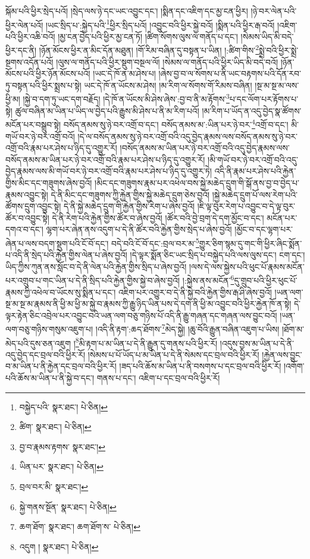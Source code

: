 སྐོམ་པའི་ཕྱིར་སྲེད་པའོ། །སྲེད་ལས་ཉེ་དང་ཡང་འབྱུང་དང་། །སྨིན་དང་འཇིག་དང་མྱ་ངན་ཕྱིར། །ཉེ་བར་ལེན་པའི་ཕྱིར་ལེན་པའོ། །ཡང་སྲིད་པ་:སྐྱེད་པའི་\footnote{བསྐྱེད་པའི་  སྣར་ཐང་།  པེ་ཅིན། }ཕྱིར་སྲིད་པའོ། །འབྱུང་བའི་ཕྱིར་སྐྱེ་བའོ། །སྨིན་པའི་ཕྱིར་རྒ་བའོ། །འཇིག་པའི་ཕྱིར་འཆི་བའོ། །མྱ་ངན་བྱེད་པའི་ཕྱིར་མྱ་ངན་ཏོ། །ཚིག་སོགས་ལུས་ལ་གནོད་པ་དང་། །སེམས་ཡིད་མི་བདེ་ཕྱིར་དང་ནི། །ཉོན་མོངས་ཕྱིར་ན་མིང་དོན་མཐུན། །གོ་རིམ་བཞིན་དུ་བསྟན་པ་ཡིན། །:ཚིག་གིས་\footnote{ཚིག་  སྣར་ཐང་།  པེ་ཅིན། }སྨྲེ་བའི་ཕྱིར་སྨྲེ་སྔགས་འདོན་པའོ། །ལུས་ལ་གནོད་པའི་ཕྱིར་སྡུག་བསྔལ་ལོ། །སེམས་ལ་གནོད་པའི་ཕྱིར་ཡིད་མི་བདེ་བའོ། །ཉོན་མོངས་པའི་ཕྱིར་ཉོན་མོངས་པའོ། །ཡང་དེ་ཁོ་ན་མ་ཤེས་པ། །ཞེས་བྱ་བ་ལ་སོགས་པ་ནི་ཡང་བརྟགས་པའི་དོན་རབ་ཏུ་བསྟན་པའི་ཕྱིར་སྨྲས་པ་སྟེ། ཡང་དེ་ཁོ་ན་ཡོངས་མ་ཤེས། །མ་རིག་ལ་སོགས་གོ་རིམས་བཞིན། །སྔ་མ་སྔ་མ་ལས་ཕྱི་མ། །སྐྱེ་བ་དག་ཏུ་ཡང་དག་བརྗོད། །དེ་ཁོ་ན་ཡོངས་མི་ཤེས་ཞེས་:བྱ་བ་ནི་མ་རྟོགས་\footnote{བྱ་བ་རྣམས་རྟགས་  སྣར་ཐང་། }པ་དང་ལོག་པར་རྟོགས་པ་སྟེ། ཚུལ་བཞིན་མ་ཡིན་པ་ཡིད་ལ་བྱེད་པའི་རྒྱུས་མི་ཤེས་པ་ནི་མ་རིག་པའོ། །མ་རིག་པ་ཡོད་ན་འདུ་བྱེད་སྣ་ཚོགས་མངོན་པར་བསྒྲུབ་སྟེ། བསོད་ནམས་སུ་ཉེ་བར་འགྲོ་བ་དང་། བསོད་ནམས་མ་:ཡིན་པར་ཉེ་བར་\footnote{ཡིན་པར་  སྣར་ཐང་།  པེ་ཅིན། }འགྲོ་བ་དང་། མི་གཡོ་བར་ཉེ་བར་འགྲོ་བའོ། །དེ་ལ་བསོད་ནམས་སུ་ཉེ་བར་འགྲོ་བའི་འདུ་བྱེད་རྣམས་ལས་བསོད་ནམས་སུ་ཉེ་བར་འགྲོ་བའི་རྣམ་པར་ཤེས་པ་ཉིད་དུ་འགྱུར་རོ། །བསོད་ནམས་མ་ཡིན་པར་ཉེ་བར་འགྲོ་བའི་འདུ་བྱེད་རྣམས་ལས་བསོད་ནམས་མ་ཡིན་པར་ཉེ་བར་འགྲོ་བའི་རྣམ་པར་ཤེས་པ་ཉིད་དུ་འགྱུར་རོ། །མི་གཡོ་བར་ཉེ་བར་འགྲོ་བའི་འདུ་བྱེད་རྣམས་ལས་མི་གཡོ་བར་ཉེ་བར་འགྲོ་བའི་རྣམ་པར་ཤེས་པ་ཉིད་དུ་འགྱུར་ཏེ། འདི་ནི་རྣམ་པར་ཤེས་པའི་རྐྱེན་གྱིས་མིང་དང་གཟུགས་ཞེས་བྱའོ། །མིང་དང་གཟུགས་རྣམ་པར་འཕེལ་བས་སྐྱེ་མཆེད་དྲུག་གི་སྒོ་ནས་བྱ་བ་བྱེད་པ་རྣམས་འབྱུང་སྟེ། དེ་ནི་མིང་དང་གཟུགས་ཀྱི་རྐྱེན་གྱིས་སྐྱེ་མཆེད་དྲུག་ཅེས་བྱའོ། །སྐྱེ་མཆེད་དྲུག་པོ་ལས་རེག་པའི་ཚོགས་དྲུག་འབྱུང་སྟེ། དེ་ནི་སྐྱེ་མཆེད་དྲུག་གི་རྐྱེན་གྱིས་རེག་པ་ཞེས་བྱའོ། །ཇི་ལྟ་བུར་རེག་པ་འབྱུང་བ་དེ་ལྟ་བུར་ཚོར་བ་འབྱུང་སྟེ། དེ་ནི་རེག་པའི་རྐྱེན་གྱིས་ཚོར་བ་ཞེས་བྱའོ། །ཚོར་བའི་བྱེ་བྲག་དེ་དག་མྱོང་བ་དང་། མངོན་པར་དགའ་བ་དང་། ལྷག་པར་ཞེན་ནས་འདུག་པ་དེ་ནི་ཚོར་བའི་རྐྱེན་གྱིས་སྲེད་པ་ཞེས་བྱའོ། །མྱོང་བ་དང་ལྷག་པར་ཞེན་པ་ལས་བདག་སྡུག་པའི་ངོ་བོ་དང་། བདེ་བའི་ངོ་བོ་དང་:བྲལ་བར་མ་\footnote{བྲལ་བར་མི་  སྣར་ཐང་། }གྱུར་ཅིག་སྙམ་དུ་གང་གི་ཕྱིར་ཞིང་སྨོན་པ་འདི་ནི་སྲེད་པའི་རྐྱེན་གྱིས་ལེན་པ་ཞེས་བྱའོ། །དེ་ལྟར་སྨོན་ཅིང་ཡང་སྲིད་པ་བསྐྱེད་པའི་ལས་ལུས་དང་། ངག་དང་། ཡིད་ཀྱིས་ཀུན་ནས་སློང་བ་དེ་ནི་ལེན་པའི་རྐྱེན་གྱིས་སྲིད་པ་ཞེས་བྱའོ། །ལས་དེ་ལས་སྐྱེས་པའི་ཕུང་པོ་རྣམས་མངོན་པར་འགྲུབ་པ་གང་ཡིན་པ་དེ་ནི་སྲིད་པའི་རྐྱེན་གྱིས་སྐྱེ་བ་ཞེས་བྱའོ། །:སྐྱེས་ནས་མངོན་\footnote{སྐྱེ་གནས་སྔོན་  སྣར་ཐང་།  པེ་ཅིན། }དུ་གྲུབ་པའི་ཕྱིར་ཕུང་པོ་རྣམས་ཀྱི་འཕེལ་བ་ཡོངས་སུ་སྨིན་པ་དང་། འཇིག་པར་འགྱུར་བ་དེ་ནི་སྐྱེ་བའི་རྐྱེན་གྱིས་རྒ་ཤི་ཞེས་བྱའོ། །ཡན་ལག་སྔ་མ་སྔ་མ་རྣམས་ནི་ཕྱི་མ་ཕྱི་མ་སྐྱེ་བ་རྣམས་ཀྱི་རྒྱུ་ཉིད་ཡིན་པས་དེ་དག་ནི་ཕྱི་མ་འབྱུང་བའི་ཕྱིར་རྐྱེན་ཁོ་ན་སྟེ། དེ་ལྟར་རྟེན་ཅིང་འབྲེལ་པར་འབྱུང་བའི་ཡན་ལག་བཅུ་གཉིས་པོ་འདི་ནི་རྒྱུ་གཞན་དང་གཞན་ལས་བྱུང་བའོ། །ཡན་ལག་བཅུ་གཉིས་གསུམ་འཇུག་པ། །འདི་ནི་རྟག་:ཆད་ཐོགས་\footnote{ཆག་ཐོག་  སྣར་ཐང་། ཆག་ཐོག་ས་  པེ་ཅིན། }མེད་སྐྱེ། །ཆུ་བོའི་རྒྱུན་བཞིན་འཇུག་པ་ཡིས། །ཐོག་མ་མེད་པའི་དུས་ཅན་འཇུག །\footnote{འདུག །  སྣར་ཐང་།  པེ་ཅིན། }མི་རྟག་པ་མ་ཡིན་པ་དེ་ནི་རྒྱུན་དུ་གནས་པའི་ཕྱིར་རོ། །འདུས་བྱས་མ་ཡིན་པ་དེ་ནི་འདུ་བྱེད་དང་བྲལ་བའི་ཕྱིར་རོ། །སེམས་པ་པོ་ཡོད་པ་མ་ཡིན་པ་དེ་ནི་སེམས་དང་བྲལ་བའི་ཕྱིར་རོ། །རྐྱེན་ལས་བྱུང་བ་མ་ཡིན་པ་ནི་རྐྱེན་དང་བྲལ་བའི་ཕྱིར་རོ། །ཟད་པའི་ཆོས་མ་ཡིན་པ་ནི་བསགས་པ་དང་བྲལ་བའི་ཕྱིར་རོ། །འགོག་པའི་ཆོས་མ་ཡིན་པ་ནི་སྐྱེ་བ་དང་། གནས་པ་དང་། འཇིག་པ་དང་བྲལ་བའི་ཕྱིར་རོ། 